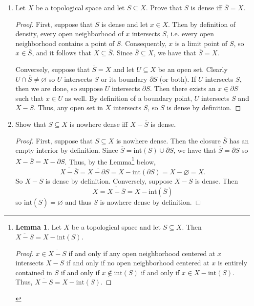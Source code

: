 \documentclass[11pt,oneside,english]{amsart}
\theoremstyle{definition}
\newtheorem*{lemma}{Lemma}
\begin{document}
\rightline{\today}



\vspace{5mm}
\begin{enumerate}
\itemsep7mm




\item Let $X$ be a topological space and let $S\subseteq X$. Prove that $S$ is dense iff $\overline{S}=X$.

\begin{proof}
First, suppose that $S$ is dense and let $x\in X$. Then by definition of density, every open neighborhood of $x$ intersects $S$, i.e. every open neighborhood contains a point of $S$. Consequently, $x$ is a limit point of $S$, so $x\in \overline{S}$, and it follows that $X\subseteq \overline{S}$. Since $\overline{S}\subseteq X$, we have that $\overline{S}=X$.

Conversely, suppose that $\overline{S}=X$ and let $U\subseteq X$ be an open set. Clearly $U\cap\overline{S}\neq \varnothing$ so $U$ intersects $S$ or its boundary $\partial S$ (or both). If $U$ intersects $S$, then we are done, so suppose $U$ intersects $\partial S$. Then there exists an $x\in \partial S$ such that $x\in U$ as well. By definition of a boundary point, $U$ intersects $S$ and $X-S$. Thus, any open set in $X$ intersects $S$, so $S$ is dense by definition.
\end{proof}

\item Show that $S\subseteq X$ is nowhere dense iff $X-\overline{S}$ is dense.

\begin{proof}
First, suppose that $S\subseteq X$ is nowhere dense. Then the closure $\overline{S}$ has an empty interior by definition. Since $\overline{S}=\text{int}(S)\cup\partial S$, we have that $\overline{S}=\partial S$ so $X-\overline{S}=X-\partial S$. Thus, by the Lemma\footnote{\begin{lemma}
Let $X$ be a topological space and let $S\subseteq X$. Then $\overline{X-S}=X-\text{int}(S)$.

\begin{proof}
$x\in\overline{X-S}$ if and only if any open neighborhood centered at $x$ intersects $X-S$ if and only if no open neighborhood centered at $x$ is entirely contained in $S$ if and only if $x\not\in\text{int}(S)$ if and only if $x\in X-\text{int}(S)$. Thus, $\overline{X-S}= X-\text{int}(S)$.
\end{proof}
\end{lemma}} below,
\[
\overline{X-\overline{S}}=\overline{X-\partial S}=X-\text{int}(\partial S)=X-\varnothing=X.
\]
So $X-\overline{S}$ is dense by definition.
Conversely, suppose $X-\overline{S}$ is dense. Then
\[
X=\overline{X-\overline{S}}=X-\text{int}(\overline{S})
\]
so $\text{int}(\overline{S})=\varnothing$ and thus $S$ is nowhere dense by definition.
\end{proof}




\end{enumerate}
\end{document}
